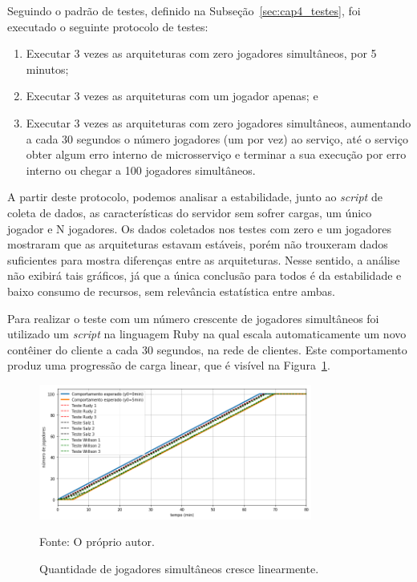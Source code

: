 Seguindo o padrão de testes, definido na Subseção~\ref{sec:cap4_testes}, foi executado o seguinte protocolo de testes:

\begin{enumerate}
  \item Executar 3 vezes as arquiteturas com zero jogadores simultâneos, por 5 minutos;
  \item Executar 3 vezes as arquiteturas com um jogador apenas; e
  \item Executar 3 vezes as arquiteturas com zero jogadores simultâneos, aumentando a cada 30 segundos o número jogadores (um por vez) ao serviço, até o serviço obter algum erro interno de microsserviço e terminar a sua execução por erro interno ou chegar a 100 jogadores simultâneos.
\end{enumerate}

A partir deste protocolo, podemos analisar a estabilidade, junto ao \textit{script} de coleta de dados, as características do servidor sem sofrer cargas, um único jogador e N jogadores.
%
Os dados coletados nos testes com zero e um jogadores mostraram que as arquiteturas estavam estáveis, porém não trouxeram dados suficientes para mostra diferenças entre as arquiteturas.
%
Nesse sentido, a análise não exibirá tais gráficos, já que a única conclusão para todos é da estabilidade e baixo consumo de recursos, sem relevância estatística entre ambas.

Para realizar o teste com um número crescente de jogadores simultâneos foi utilizado um \textit{script} na linguagem Ruby na qual escala automaticamente um novo contêiner do cliente a cada 30 segundos, na rede de clientes.
%
Este comportamento produz uma progressão de carga linear, que é visível na Figura~\ref{fig:cliente_linear}.
\pagebreak
\begin{figure}[htb!]
  \caption{Quantidade de jogadores simultâneos cresce linearmente.}
  \label{fig:cliente_linear}
  \includegraphics[width=0.8\textwidth]{figuras/network/clientes_script.png}
  \centering

  Fonte: O próprio autor.
\end{figure}

